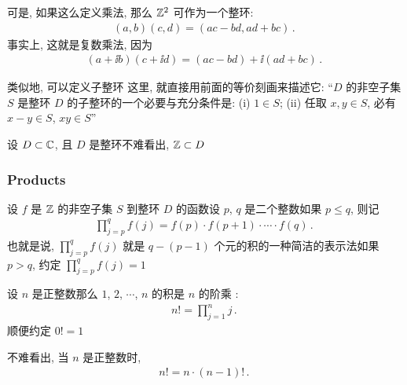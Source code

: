 \begin{remark}
    可是, 如果这么定义乘法, 那么 $\mathbb{Z}^2$ 可作为一个整环:
    \begin{align*}
        (a,b)(c,d) = (ac-bd,ad+bc)\period
    \end{align*}
    事实上, 这就是复数乘法, 因为
    \begin{align*}
        (a+ \ii b)(c+ \ii d) = (ac-bd) + \ii (ad+bc) \period
    \end{align*}
\end{remark}

\begin{remark}
    类似地, 可以定义子整环 \period 这里, 就直接用前面的等价刻画来描述它: ``$D$ 的非空子集 $S$ 是整环 $D$ 的子整环的一个必要与充分条件是: (i) $1 \in S$; (ii) 任取 $x,y \in S$, 必有 $x-y \in S$, $xy \in S$\period ''
\end{remark}

\begin{example}
    设 $D \subset \mathbb{C}$, 且 $D$ 是整环\period 不难看出, $\mathbb{Z} \subset D$\period
\end{example}

\subsubsection*{Products}

\begin{definition}
    设 $f$ 是 $\mathbb{Z}$ 的非空子集 $S$ 到整环 $D$ 的函数\period 设 $p$, $q$ 是二个整数\period 如果 $p \leq q$, 则记
    \begin{align*}
        \prod_{j = p}^{q} f(j) = f(p) \cdot f(p + 1) \cdot \cdots \cdot f(q)\period
    \end{align*}
    也就是说, $\prod_{j = p}^{q} f(j)$ 就是 $q - (p - 1)$ 个元的积的一种简洁的表示法\period 如果 $p > q$, 约定 $\prod_{j = p}^{q} f(j) = 1$\period
\end{definition}

\begin{definition}
    设 $n$ 是正整数\period 那么 $1$, $2$, $\cdots$, $n$ 的积是 $n$ 的阶乘 :
    \begin{align*}
        n! = \prod_{j = 1}^{n} j \period
    \end{align*}
    顺便约定 $0! = 1$\period
\end{definition}

\begin{remark}
    不难看出, 当 $n$ 是正整数时,
    \begin{align*}
        n! = n \cdot (n-1)! \period
    \end{align*}
\end{remark}

